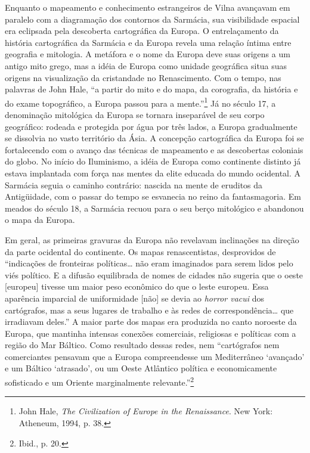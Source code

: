 \asterisc

Enquanto o mapeamento e conhecimento estrangeiros de Vilna avançavam em
paralelo com a diagramação dos contornos da Sarmácia, sua visibilidade
espacial era eclipsada pela descoberta cartográfica da Europa. O
entrelaçamento da história cartográfica da Sarmácia e da Europa revela
uma relação íntima entre geografia e mitologia. A metáfora e o nome da
Europa deve suas origens a um antigo mito grego, mas a idéia de Europa
como unidade geográfica situa suas origens na visualização da
cristandade no Renascimento. Com o tempo, nas palavras de John Hale, ``a
partir do mito e do mapa, da corografia, da história e do exame
topográfico, a Europa passou para a mente.''\footnote{John Hale,
  \emph{The Civilization of Europe in the Renaissance}. New York:
  Atheneum, 1994, p. 38.} Já no século 17, a denominação mitológica da
Europa se tornara inseparável de seu corpo geográfico: rodeada e
protegida por água por três lados, a Europa gradualmente se dissolvia no
vasto território da Ásia. A concepção cartográfica da Europa foi se
fortalecendo com o avanço das técnicas de mapeamento e as descobertas
coloniais do globo. No início do Iluminismo, a idéia de Europa como
continente distinto já estava implantada com força nas mentes da elite
educada do mundo ocidental. A Sarmácia seguia o caminho contrário:
nascida na mente de eruditos da Antigüidade, com o passar do tempo se
esvanecia no reino da fantasmagoria. Em meados do século 18, a Sarmácia
recuou para o seu berço mitológico e abandonou o mapa da Europa.

Em geral, as primeiras gravuras da Europa não revelavam inclinações na
direção da parte ocidental do continente. Os mapas renascentistas,
desprovidos de ``indicações de fronteiras políticas\ldots{} não eram
imaginados para serem lidos pelo viés político. E a difusão equilibrada
de nomes de cidades não sugeria que o oeste {[}europeu{]} tivesse um
maior peso econômico do que o leste europeu. Essa aparência imparcial de
uniformidade {[}não{]} se devia ao \emph{horror vacui} dos cartógrafos,
mas a seus lugares de trabalho e às redes de correspondência\ldots{} que
irradiavam deles.'' A maior parte dos mapas era produzida no canto
noroeste da Europa, que mantinha intensas conexões comerciais,
religiosas e políticas com a região do Mar Báltico. Como resultado
dessas redes, nem ``cartógrafos nem comerciantes pensavam que a Europa
compreendesse um Mediterrâneo `avançado' e um Báltico `atrasado', ou um
Oeste Atlântico política e economicamente sofisticado e um Oriente
marginalmente relevante.''\footnote{Ibid., p. 20.}

